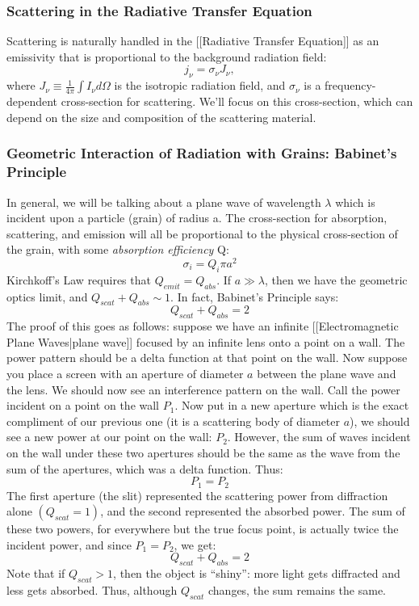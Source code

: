 \documentclass{article}
\begin{document}
\subsubsection*{Scattering in the Radiative Transfer Equation}

Scattering is naturally handled in the [[Radiative Transfer Equation]] as an emissivity that is proportional to the background
radiation field:
\begin{equation}
j_\nu=\sigma_\nu J_\nu,
\end{equation}
where $J_\nu\equiv\frac1{4\pi}\int{I_\nu d\Omega}$ is the isotropic radiation field, and $\sigma_\nu$ is a frequency-dependent
cross-section for scattering.  We'll focus on this cross-section, which can depend on the size and composition of the scattering material.

\subsubsection*{Geometric Interaction of Radiation with Grains: Babinet’s Principle}

In general, we will be talking about a plane wave of wavelength $\lambda$
which is incident upon a particle (grain) of radius a.  The cross-section
for absorption, scattering, and emission will all be proportional to the
physical cross-section of the grain, with some {\it absorption efficiency}
Q:
$$\sigma_i=Q_i\pi a^2$$
Kirchkoff's Law requires that $Q_{emit}=Q_{abs}$.  If $a\gg\lambda$, then
\def\qscat{Q_{scat}}
\def\qabs{Q_{abs}}
we have the geometric optics limit, and $\qscat+\qabs\sim1$.  In fact,
Babinet's Principle says:
$$\boxed{\qscat+\qabs=2}$$
The proof of this goes as follows: suppose we have an infinite [[Electromagnetic Plane Waves|plane wave]]
focused by an infinite lens onto a point on a wall.  The power pattern
should be a delta function at that point on the wall.  Now suppose you
place a screen with an aperture of diameter $a$ between the plane wave
and the lens.  We should now see an interference pattern on the wall.  Call
the power incident on a point on the wall $P_1$.  Now put in a new aperture
which is the exact compliment of our previous one (it is a scattering
body of diameter $a$), we should see a new power at our point on the wall: 
$P_2$.
However, the sum of waves incident on the wall under these two apertures
should be the same as the wave from the sum of the apertures, which was
a delta function.  Thus:
$$P_1=P_2$$
The first aperture (the slit) represented the scattering power from 
diffraction alone $(\qscat=1)$, and the second represented the absorbed 
power.  The sum of these two powers, for everywhere but the true focus
point, is actually twice the incident power, and since $P_1=P_2$, we
get:
$$\qscat+\qabs=2$$
Note that if $\qscat>1$, then the object is ``shiny'': more light gets
diffracted and less gets absorbed.  Thus, although $\qscat$ changes,
the sum remains the same.
\end{document}

